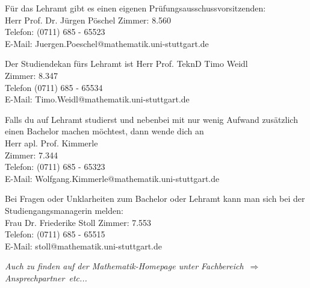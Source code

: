 \label{LAzust}
Für das Lehramt gibt es einen eigenen Prüfungsausschussvorsitzenden:\\
Herr Prof. Dr. Jürgen Pöschel
Zimmer:  8.560\\
Telefon: (0711) 685 - 65523\\
E-Mail: Juergen.Poeschel@mathematik.uni-stuttgart.de

Der Studiendekan fürs Lehramt ist
Herr Prof. TeknD Timo Weidl\\
Zimmer: 8.347\\
Telefon (0711) 685 - 65534\\
E-Mail: Timo.Weidl@mathematik.uni-stuttgart.de

Falls du auf Lehramt studierst
und nebenbei mit nur wenig Aufwand
zusätzlich einen Bachelor machen möchtest,
dann wende dich an\\
Herr apl. Prof. Kimmerle\\
Zimmer: 7.344\\
Telefon: (0711) 685 - 65323\\
E-Mail: Wolfgang.Kimmerle@mathematik.uni-stuttgart.de

Bei Fragen oder Unklarheiten zum Bachelor
oder Lehramt kann man sich
bei der Studiengangsmanagerin melden:\\
Frau Dr. Friederike Stoll
Zimmer:  7.553 \\
Telefon: (0711) 685 - 65515 \\
E-Mail: stoll@mathematik.uni-stuttgart.de

{\it Auch zu finden auf der Mathematik-Homepage unter \glqq Fachbereich\grqq\ 
$\Rightarrow$ \glqq Ansprechpartner\grqq\ etc...}
\\
